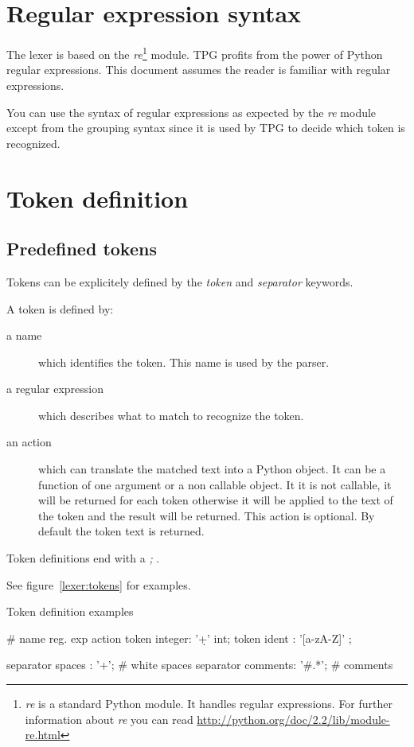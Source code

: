 \section{Regular expression syntax}

The lexer is based on the \emph{re}\footnote{\emph{re} is a standard Python module. It handles regular expressions. For further information about \emph{re} you can read \url{http://python.org/doc/2.2/lib/module-re.html}} module.
TPG profits from the power of Python regular expressions.
This document assumes the reader is familiar with regular expressions.

You can use the syntax of regular expressions as expected by the \emph{re} module except from the grouping syntax since it is used by TPG to decide which token is recognized.

\section{Token definition}
\label{lexer:token_def}

\subsection{Predefined tokens}

Tokens can be explicitely defined by the \emph{token} and \emph{separator} keywords.

A token is defined by:

\begin{description}
	\item [a name] which identifies the token.
		This name is used by the parser.
	\item [a regular expression] which describes what to match to recognize the token.
	\item [an action] which can translate the matched text into a Python object. It can be a function of one argument or a non callable object. It it is not callable, it will be returned for each token otherwise it will be applied to the text of the token and the result will be returned. This action is optional. By default the token text is returned.
\end{description}

Token definitions end with a \emph{;} .

See figure~\ref{lexer:tokens} for examples.

\begin{code}
\caption{Token definition examples} \label{lexer:tokens}
\begin{verbatimtab}[4]
	#     name     reg. exp        action
	token integer: '\d+'           int;
	token ident  : '[a-zA-Z]\w*'   ;

	separator spaces  : '\s+';     # white spaces
	separator comments: '#.*';     # comments
\end{verbatimtab}
\end{code}

